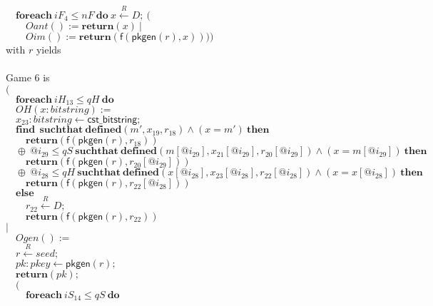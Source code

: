 \documentclass{article}
\newcommand{\store}{\leftarrow}
\newcommand{\getR}{\stackrel{R}{\store}}
\newcommand{\kw}[1]{\mathbf{#1}}
\newcommand{\kwf}[1]{\mathsf{#1}}
\newcommand{\var}[1]{\mathit{#1}}
\newcommand{\kwt}[1]{\mathit{#1}}
\newcommand{\kwp}[1]{\mathit{#1}}
\begin{document}
\begin{tabbing}
$\quad  \kw{foreach}\ \var{iF}_{4} \leq \kwp{nF}\ \kw{do}\ \var{x} \getR D;\ ($\\
$\quad  \quad Oant() := \kw{return}(\var{x})\ |$\\
$\quad  \quad Oim() := \kw{return}(\kwf{f}(\kwf{pkgen}(\var{r}), \var{x}))))$\\
with $\var{r}$ yields\\
\\
Game 6 is\\
$($\\
$\quad \kw{foreach}\ \var{iH}_{13} \leq \kwp{qH}\ \kw{do}$\\
$\quad OH(\var{x}: \kwt{bitstring}) :=$\\
$\quad \var{x}_{23}: \kwt{bitstring} \store \kwf{cst\_bitstring};$\\
$\quad \kw{find}\ \ \kw{suchthat}\ \kw{defined}(\var{m'}, \var{x}_{19}, \var{r}_{18})\wedge (\var{x}  =  \var{m'})\ \kw{then}$\\
$\quad \quad \kw{return}\kwf{}(\kwf{f}(\kwf{pkgen}(\var{r}), \var{r}_{18}))$\\
$\quad \oplus\ \var{@i}_{29} \leq \kwp{qS}\ \kw{suchthat}\ \kw{defined}(\var{m}[\var{@i}_{29}], \var{x}_{21}[\var{@i}_{29}], \var{r}_{20}[\var{@i}_{29}])\wedge (\var{x}  =  \var{m}[\var{@i}_{29}])\ \kw{then}$\\
$\quad \quad \kw{return}\kwf{}(\kwf{f}(\kwf{pkgen}(\var{r}), \var{r}_{20}[\var{@i}_{29}]))$\\
$\quad \oplus\ \var{@i}_{28} \leq \kwp{qH}\ \kw{suchthat}\ \kw{defined}(\var{x}[\var{@i}_{28}], \var{x}_{23}[\var{@i}_{28}], \var{r}_{22}[\var{@i}_{28}])\wedge (\var{x}  =  \var{x}[\var{@i}_{28}])\ \kw{then}$\\
$\quad \quad \kw{return}\kwf{}(\kwf{f}(\kwf{pkgen}(\var{r}), \var{r}_{22}[\var{@i}_{28}]))$\\
$\quad \kw{else}$\\
$\quad \quad \var{r}_{22} \getR \kwt{D};$\\
$\quad \quad \kw{return}\kwf{}(\kwf{f}(\kwf{pkgen}(\var{r}), \var{r}_{22}))$\\
$|$\\
$\quad Ogen() :=$\\
$\quad \var{r} \getR \kwt{seed};$\\
$\quad \var{pk}: \kwt{pkey} \store \kwf{pkgen}(\var{r});$\\
$\quad \kw{return}\kwf{}(\var{pk});$\\
$\quad ($\\
$\quad \quad \kw{foreach}\ \var{iS}_{14} \leq \kwp{qS}\ \kw{do}$\\

\end{tabbing}
\end{document}
